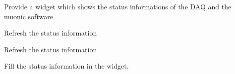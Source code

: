 \documentclass[letterpaper,10pt,english]{sphinxmanual}
\begin{document}
\begin{fulllineitems}
\label{muonic:muonic.gui.MuonicWidgets.StatusWidget}
Provide a widget which shows the status informations of the DAQ and the muonic software

\begin{fulllineitems}
\label{muonic:muonic.gui.MuonicWidgets.StatusWidget.is_active}
\end{fulllineitems}


\begin{fulllineitems}
\label{muonic:muonic.gui.MuonicWidgets.StatusWidget.on_refresh_clicked}
Refresh the status information

\end{fulllineitems}


\begin{fulllineitems}
\label{muonic:muonic.gui.MuonicWidgets.StatusWidget.on_save_clicked}
Refresh the status information

\end{fulllineitems}


\begin{fulllineitems}
\label{muonic:muonic.gui.MuonicWidgets.StatusWidget.update}
Fill the status information in the widget.

\end{fulllineitems}


\end{fulllineitems}

\end{document}
